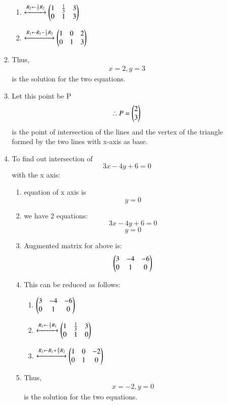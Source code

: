 \documentclass[journal,12pt,twocolumn]{IEEEtran}
\renewcommand\thesection{\arabic{section}}
\begin{document}
\begin{enumerate}[label=\thesection.\arabic*.,ref=\thesection.\theenumi]
\begin{enumerate}
\begin{enumerate}
    \item $\xleftrightarrow{R_2\leftarrow \frac{1}{5}R_2}
    \begin{pmatrix}1&\frac{1}{3}&3\\0&1&3\end{pmatrix}\\$
    \item $\xleftrightarrow{R_1\leftarrow R_1-\frac{1}{3}R_2}
    \begin{pmatrix}1&0&2\\0&1&3\end{pmatrix}$
\end{enumerate}
\item Thus,
\begin{align}
    x=2, y=3
\end{align} 
is the solution for the two equations. 
\item  Let this point be P
\begin{align}
\therefore P=\begin{pmatrix}2\\3\end{pmatrix}
\end{align}
is the point of intersection of the lines and the vertex of the triangle formed by the two lines with x-axis as base.
\item To find out intersection of \[3x-4y+6=0\] with the x axis:
\begin{enumerate}
    \item equation of x axis is \[y=0\]
    \item we have 2 equations: \[3x-4y+6=0\] \[y=0\]
    \item Augmented matrix for above is:
\begin{align}
    \begin{pmatrix}3 & -4 & -6\\
           0 & 1 & 0\end{pmatrix}
\end{align}
\item This can be reduced as follows:
\begin{enumerate}
    \item $\begin{pmatrix}3 & -4 & -6\\
           0 & 1 & 0\end{pmatrix}$
    \item $\xleftrightarrow {R_1 \leftarrow \frac{1}{3}R_1}
    \begin{pmatrix}1 & \frac{1}{3} & 3\\
          0 & 1 & 0\end{pmatrix}\\$
          \item $\xleftrightarrow{R_1 \leftarrow R_1 + \frac{4}{3}R_2}
    \begin{pmatrix}1 &0&-2\\
        0&1&0\end{pmatrix}\\$
\end{enumerate}
\item Thus,
\begin{align}
    x=-2, y=0
\end{align} 
is the solution for the two equations. 

\end{enumerate}
\end{enumerate}
\end{enumerate}
\end{document}
